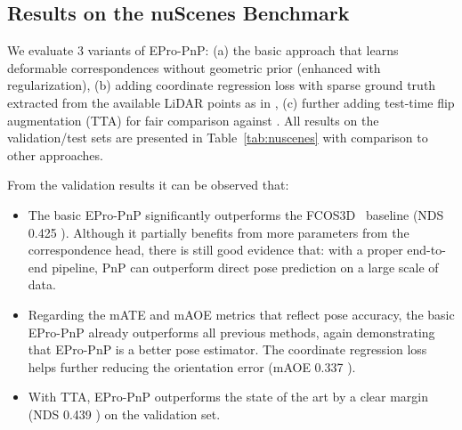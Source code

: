 \documentclass[10pt,twocolumn,letterpaper]{article}
\begin{document}
\begin{figure*}[t]
\begin{floatrow}
{{}
    \label{tab:nuscenes}}
\hspace*{-3ex}
\end{floatrow}
\vspace*{-0.5ex}
\end{figure*}

\subsection{Results on the nuScenes Benchmark}

We evaluate 3 variants of EPro-PnP: (a) the basic approach that learns deformable correspondences without geometric prior (enhanced with regularization), (b) adding coordinate regression loss with sparse ground truth extracted from the available LiDAR points as in \cite{monorun}, (c) further adding test-time flip augmentation (TTA) for fair comparison against \cite{fcos3d, pgd}. All results on the validation/test sets are presented in Table~\ref{tab:nuscenes} with comparison to other approaches.

\addtocounter{footnote}{-1}


From the validation results it can be observed that:
\begin{itemize}[noitemsep,topsep=0.7ex,partopsep=0.7ex]
\item The basic EPro-PnP significantly outperforms the FCOS3D~\cite{fcos3d} baseline (NDS 0.425 ). Although it partially benefits from more parameters from the correspondence head, there is still good evidence that: with a proper end-to-end pipeline, PnP can outperform direct pose prediction on a large scale of data.
\item Regarding the mATE and mAOE metrics that reflect pose accuracy, the basic EPro-PnP already outperforms all previous methods, again demonstrating that EPro-PnP is a better pose estimator. The coordinate regression loss helps further reducing the orientation error (mAOE 0.337 ).
\item With TTA, EPro-PnP outperforms the state of the art by a clear margin (NDS 0.439 ) on the validation set.
\end{itemize}
\end{document}

